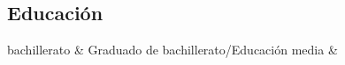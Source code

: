 
\begin{CVbody}

    \section{Educación}
    
    \begin{CV_table}
    
    
    bachillerato   &   Graduado de bachillerato/Educación media     &      \\
    
    
    \end{CV_table}
    
    
    \end{CVbody}
    
    
    
    
    
    
    
    
    
    
    
    
    
    
